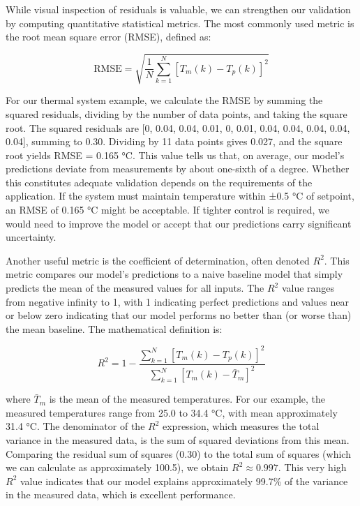 While visual inspection of residuals is valuable, we can strengthen our validation by computing quantitative statistical metrics. The most commonly used metric is the root mean square error (RMSE), defined as:

\begin{equation}
\text{RMSE} = \sqrt{\frac{1}{N}\sum_{k=1}^{N} \left[ T_m(k) - T_p(k) \right]^2}
\end{equation}

For our thermal system example, we calculate the RMSE by summing the squared residuals, dividing by the number of data points, and taking the square root. The squared residuals are [0, 0.04, 0.04, 0.01, 0, 0.01, 0.04, 0.04, 0.04, 0.04, 0.04], summing to 0.30. Dividing by 11 data points gives 0.027, and the square root yields RMSE = 0.165 °C. This value tells us that, on average, our model's predictions deviate from measurements by about one-sixth of a degree. Whether this constitutes adequate validation depends on the requirements of the application. If the system must maintain temperature within ±0.5 °C of setpoint, an RMSE of 0.165 °C might be acceptable. If tighter control is required, we would need to improve the model or accept that our predictions carry significant uncertainty.

Another useful metric is the coefficient of determination, often denoted $R^2$. This metric compares our model's predictions to a naive baseline model that simply predicts the mean of the measured values for all inputs. The $R^2$ value ranges from negative infinity to 1, with 1 indicating perfect predictions and values near or below zero indicating that our model performs no better than (or worse than) the mean baseline. The mathematical definition is:

\begin{equation}
R^2 = 1 - \frac{\sum_{k=1}^{N} \left[ T_m(k) - T_p(k) \right]^2}{\sum_{k=1}^{N} \left[ T_m(k) - \bar{T}_m \right]^2}
\end{equation}

where $\bar{T}_m$ is the mean of the measured temperatures. For our example, the measured temperatures range from 25.0 to 34.4 °C, with mean approximately 31.4 °C. The denominator of the $R^2$ expression, which measures the total variance in the measured data, is the sum of squared deviations from this mean. Comparing the residual sum of squares (0.30) to the total sum of squares (which we can calculate as approximately 100.5), we obtain $R^2 \approx 0.997$. This very high $R^2$ value indicates that our model explains approximately 99.7\% of the variance in the measured data, which is excellent performance.

